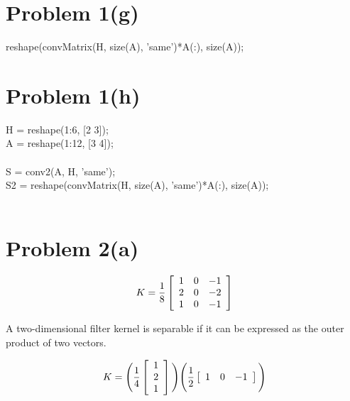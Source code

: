 \documentclass{article}
\newif\ifstays
\begin{document}
\ifstays
Here is the code snippet in case you want to cut and paste:
\begin{verbatim}
C = [1 1; 1 2; 2 1; 2 2; 3 2; 3 3];
M = cell(size(C, 1), 1);
for k = 1:size(C, 1)
    M{k} = convMatrix(reshape(1:prod(C(k, :)), C(k, :)), [2 3], 'same');
    latexArray(M{k}, sprintf('M\\{%d\\}', k), sprintf('../M%d.tex', k), '%d');
end
\end{verbatim}
\fi

\section*{Problem 1(g)}

reshape(convMatrix(H, size(A), 'same')*A(:), size(A));

\section*{Problem 1(h)}

H = reshape(1:6, [2 3]);\\
A = reshape(1:12, [3 4]);\\\\
S = conv2(A, H, 'same');\\
S2 = reshape(convMatrix(H, size(A), 'same')*A(:), size(A));\\\\

\[
    
    
\]

\newpage
\section*{Problem 2(a)}

\[
K = \frac{1}{8}\left[\begin{array}{*{3}c}
 1 & 0 & -1\\
 2 & 0 & -2\\
 1 & 0 & -1
\end{array}\right]
\]

A two-dimensional filter kernel is separable if it can be expressed as the outer product of two vectors.

\[
K = \Bigg(\frac{1}{4}\left[\begin{array}{*{3}c}
 1\\
 2\\
 1
\end{array}\right]\Bigg)
\Bigg(\frac{1}{2}\left[\begin{array}{*{3}c}
 1 & 0 & -1
\end{array}\right]\Bigg)
\]
\end{document}
